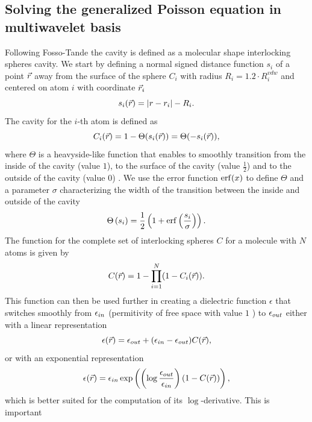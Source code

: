\documentclass[../master_thesis.tex]{subfiles}
\begin{document}
\subsection{Solving the generalized Poisson equation in multiwavelet basis}\label{solmw}
Following Fosso-Tande \cite{FossoTande:2013ka} the cavity is defined as a molecular shape
interlocking spheres cavity. We start by defining a normal
signed distance function $s_i$ of a point $\vec{r}$ away from the surface of the
sphere $C_i$ with radius $R_i = 1.2\cdot R^{vdw}_i$ and centered on atom $i$ with
coordinate $\vec{r}_i$ \cite{FossoTande:2013ka}
\begin{equation}
  s_i(\vec{r}) = \abs{r -r_i} - R_i.
\end{equation}
The cavity for the $i$-th atom is defined as
\begin{equation}
  C_i(\vec{r}) = 1 - \Theta(s_i(\vec{r})) =\Theta(-s_i(\vec{r})),
\end{equation}
where $\Theta$ is a heavyside-like function that enables to smoothly transition
from the inside of the cavity (value $1$), to the surface of the cavity (value
$\frac{1}{2}$) and to the outside of the cavity (value $0$)
\cite{Sorland, FossoTande:2013ka}. We use the error function $\erf(x)$ to define
$\Theta$ and a parameter $\sigma$ characterizing the width of the transition
between the inside and outside of the cavity
\begin{equation}
  \Theta\left(s_i\right) = \frac{1}{2}\left(1 + \erf\left(\frac{s_i}
  {\sigma}\right)\right).
\end{equation}
The function for the complete set of interlocking spheres $C$ for a molecule
with $N$ atoms is given by
\begin{equation}
  C(\vec{r}) = 1 - \prod_{i=1}^N(1 - C_i(\vec{r})).
\end{equation}
This function can then be used further in creating a dielectric function
$\epsilon$ that switches smoothly from $\epsilon_{in}$ (permitivity of free space
with value $1$ \cite{FossoTande:2013ka}) to $\epsilon_{out}$ either with a linear
representation
\begin{equation}\label{eq:dielfuncexp}
  \epsilon(\vec{r}) = \epsilon_{out}  + (\epsilon_{in} - \epsilon_{out})C(\vec{r}),
\end{equation}
or with an exponential representation
\begin{equation}\label{eq:dielfunclin}
  \epsilon(\vec{r}) =\epsilon_{in}\exp\left( \left(\log\frac{\epsilon_{out}}{\epsilon_{in}} \right)
  (1 - C(\vec{r})) \right),
\end{equation}
which is better suited for the computation of its $\log$-derivative. This is important
\end{document}
